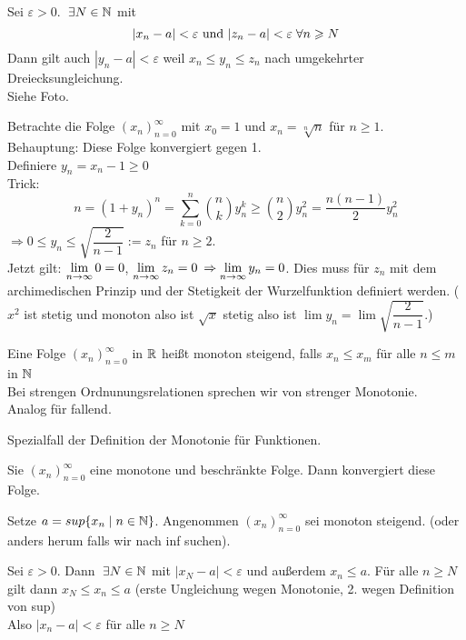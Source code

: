 \documentclass[main.tex]{subfiles}
\begin{document}
\begin{Beweis}
  Sei $\varepsilon > 0$. $\;\exists N \in \mathbb{N}$ mit
  $$|x_n - a| < \varepsilon \text{ und } |z_n - a| < \varepsilon \;\forall n \geqslant N$$
  Dann gilt auch $|y_n - a| < \varepsilon$ weil $x_n \leq y_n \leq z_n$ nach umgekehrter Dreiecksungleichung.\\
  Siehe Foto.
\end{Beweis}

\begin{Beispiel}
  Betrachte die Folge $(x_n)_{n=0}^\infty$ mit $x_0 = 1$ und $x_n = \sqrt[n]{n}$ für $n \geq 1$.\\
  Behauptung: Diese Folge konvergiert gegen 1.\\
  Definiere $y_n = x_n -1 \geq 0$\\
  Trick: $$n = (1+y_n)^n = \sum \limits_{k=0}^n {n \choose k} y_n^k \geq {n \choose 2} y_n^2 = \dfrac{n(n-1)}{2}y_n^2$$
  $\Rightarrow 0 \leq y_n \leq \sqrt{\dfrac{2}{n-1}} := z_n$ für $n\geq 2$.\\
  Jetzt gilt: $\lim \limits_{n \to \infty} 0 = 0$, $\lim \limits_{n \to \infty} z_n = 0$ $\Rightarrow \lim \limits_{n \to \infty} y_n = 0$. Dies muss für $z_n$ mit dem archimedischen Prinzip und der Stetigkeit der Wurzelfunktion definiert werden. ($x^2$ ist stetig und monoton also ist $\sqrt{x}$ stetig also ist $\lim y_n = \lim \sqrt{\dfrac{2}{n-1}}$.)
\end{Beispiel}

\begin{Definition}
  Eine Folge $(x_n)_{n=0}^\infty$ in $\mathbb{R}$ heißt monoton steigend, falls $x_n \leq x_m$ für alle $n \leq m$ in $\mathbb{N}$\\
  Bei strengen Ordnunungsrelationen sprechen wir von strenger Monotonie.\\
  Analog für fallend.
\end{Definition}
\begin{Bemerkung}
  Spezialfall der Definition der Monotonie für Funktionen.
\end{Bemerkung}

\begin{Theorem}
  Sie $(x_n)_{n=0}^\infty$ eine monotone und beschränkte Folge. Dann konvergiert diese Folge.
\end{Theorem}
\begin{Beweis}
  Setze $a = sup\{x_n \mid n \in \mathbb{N}\}$. Angenommen $(x_n)_{n=0}^\infty$ sei monoton steigend. (oder anders herum falls wir nach inf suchen).

  Sei $\varepsilon > 0$. Dann $\;\exists N \in \mathbb{N}$ mit $|x_N - a|< \varepsilon$ und außerdem $x_n \leq a$. Für alle $n \geq N$ gilt dann $x_N \leq x_n \leq a$ (erste Ungleichung wegen Monotonie, 2. wegen Definition von sup)\\
  Also $|x_n - a| < \varepsilon$ für alle $n \geq N$
\end{Beweis}
\end{document}
